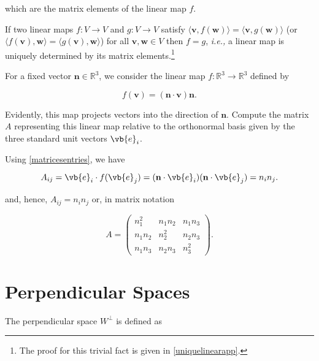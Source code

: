 \documentclass[a4paper,12pt]{report}
\begin{document}
which are the matrix elements of the linear map \(f\).

\begin{lemma} \label{linearuniquemap} 
If two linear maps \( f : V \rightarrow V \) and \( g : V \rightarrow V \) satisfy \( \langle \mathbf{v}, f(\mathbf{w}) \rangle = \langle \mathbf{v}, g(\mathbf{w}) \rangle \) (or \( \langle f(\mathbf{v}), \mathbf{w} \rangle = \langle g(\mathbf{v}), \mathbf{w} \rangle \)) for all \( \mathbf{v}, \mathbf{w} \in V \) then \( f = g \), \textit{i.e.,} a linear map is uniquely determined by its matrix elements.\footnote{The proof for this trivial fact is given in \cref{uniquelinearapp}.} 
\end{lemma}

{For a fixed vector \(\mathbf{n} \in \mathbb{R}^3\), we consider the linear map \(f : \mathbb{R}^3 \to \mathbb{R}^3\) defined by

\begin{equation}
f(\mathbf{v}) = (\mathbf{n} \cdot \mathbf{v}) \mathbf{n}.
\end{equation}

Evidently, this map projects vectors into the direction of \(\mathbf{n}\). Compute the matrix \(A\) representing this linear map relative to the orthonormal basis given by the three standard unit vectors \(\vb{e}_i\).
}
{Using \cref{matricesentries}, we have

\begin{equation}
    A_{ij} = \vb{e}_i \cdot f(\vb{e}_j) = (\mathbf{n} \cdot \vb{e}_i)(\mathbf{n} \cdot \vb{e}_j) = n_i n_j.
\end{equation}
    
and, hence, \(A_{ij} = n_i n_j\) or, in matrix notation
    
\begin{equation}
A = \begin{pmatrix}
n_1^2 & n_1 n_2 & n_1 n_3 \\
n_1 n_2 & n_2^2 & n_2 n_3 \\
n_1 n_3 & n_2 n_3 & n_3^2
\end{pmatrix}.
\end{equation}} 

\section{Perpendicular Spaces}

The perpendicular space \(W^{\perp } \) is defined as 
\end{document}
